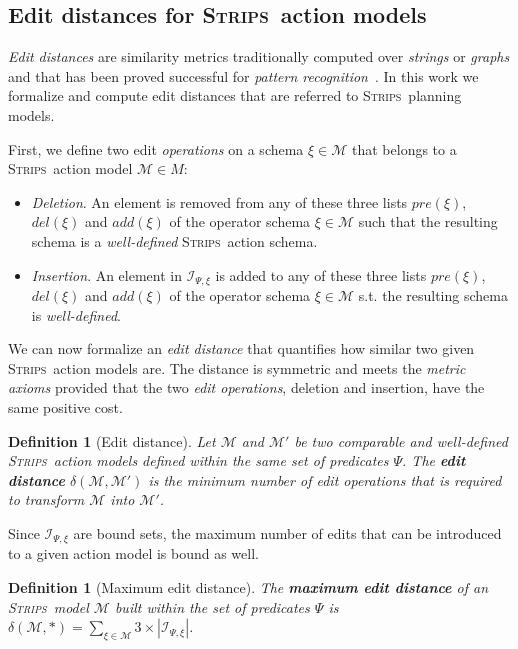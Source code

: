 \documentclass[letterpaper]{article} %
\newcommand{\strips}{\textsc{Strips}}     %
\newtheorem{definition}[theorem]{Definition}
\begin{document}
\subsection{Edit distances for \strips\ action models}
{\em Edit distances} are similarity metrics traditionally computed over {\em strings} or {\em graphs} and that has been proved successful for {\em pattern recognition}~\cite{masek1980faster,bunke1997relation}. In this work we formalize and compute edit distances that are referred to \strips\ planning models. 

First, we define two edit \emph{operations} on a schema $\xi\in\mathcal{M}$ that belongs to a \strips\ action model $\mathcal{M}\in M$:
\begin{itemize}
\item {\em Deletion}. An element is removed from any of these three lists $pre(\xi)$, $del(\xi)$ and $add(\xi)$ of the operator schema $\xi\in\mathcal{M}$ such that the resulting schema is a {\em well-defined} \strips\ action schema.
\item {\em Insertion}. An element in ${\mathcal I}_{\Psi,\xi}$ is added to any of these three lists $pre(\xi)$, $del(\xi)$ and $add(\xi)$ of the operator schema $\xi\in\mathcal{M}$ s.t. the resulting schema is {\em well-defined}.
\end{itemize}

We can now formalize an {\em edit distance} that quantifies how similar two given \strips\ action models are. The distance is symmetric and meets the {\em metric axioms} provided that the two {\em edit operations}, deletion and insertion, have the same positive cost.

\begin{definition}[Edit distance]
  Let $\mathcal{M}$ and $\mathcal{M}'$ be two {\em comparable} and {\em well-defined} \strips\ action models defined within the same set of predicates $\Psi$. The {\bf edit distance} $\delta(\mathcal{M},\mathcal{M}')$ is the minimum number of {\em edit operations} that is required to transform $\mathcal{M}$ into $\mathcal{M}'$.
\end{definition}

Since ${\mathcal I}_{\Psi,\xi}$ are bound sets, the maximum number of edits that can be introduced to a given action model is bound as well. 
\begin{definition}[Maximum edit distance]
The \textbf{maximum edit distance} of an \strips\ model $\mathcal{M}$ built within the set of predicates $\Psi$ is $\delta(\mathcal{M},*)=\sum_{\xi\in\mathcal{M}} 3\times|{\mathcal I}_{\Psi,\xi}|$.
\end{definition}
\end{document}
